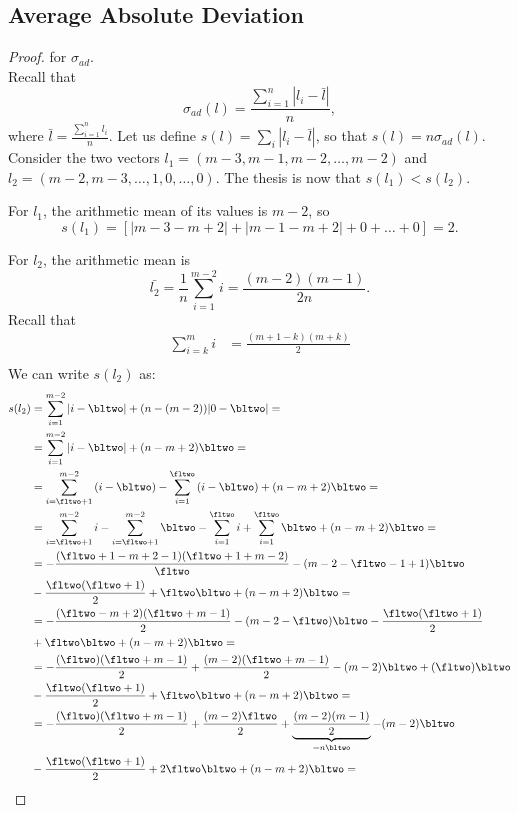 \subsection{Average Absolute Deviation}
\begin{proof} for $\sigma_{ad}$. \\
	Recall that 
	\[\sigma_{ad}(l)= \frac{\sum_{i=1}^{n}|l_i-\bar{l}|}{n},\] 
	where $\bar{l}=\frac{\sum_{i=1}^{n}l_i}{n}$.
	Let us define $s(l)= \sum_{i}|l_i-\bar{l}|$, so that $s(l) = n \sigma_{ad}(l)$.
	Consider the two vectors $l_1=(m-3, m-1, m-2, \dots, m-2)$ and $l_2=(m-2, m-3, \dots, 1, 0, \dots, 0)$. The thesis is now that $s(l_1) < s(l_2)$.
	
	For $l_1$, the arithmetic mean of its values is $m-2$, so 
	\[s(l_1)=[|m-3-m+2|+|m-1-m+2|+ 0 + \dots + 0]= 2.\]

	For $l_2$, the arithmetic mean is 
	\[\bar{l_2}=\frac{1}{n}\sum_{i=1}^{m-2}{i}= \frac{(m-2)(m-1)}{2n}.\]
	Recall that 
	\begin{align*}
		\sum_{i=k}^{m}{i} &= \frac{(m+1-k)(m+k)}{2} \\
	\end{align*}
	We can write $s(l_2)$ as:
	\begin{align*}
		s(l_2)&= \sum_{i=1}^{m-2}{|i-\bltwo|}+(n-(m-2))|0-\bltwo|=\\
		&= \sum_{i=1}^{m-2}{|i-\bltwo|}+(n-m+2)\bltwo=\\
		&=\sum_{i=\fltwo+1}^{m-2}{(i-\bltwo)}-\sum_{i=1}^{\fltwo}{(i-\bltwo)} +(n-m+2)\bltwo=\\
		&=\sum_{i=\fltwo+1}^{m-2}{i}-\sum_{i=\fltwo+1}^{m-2}{\bltwo}-\sum_{i=1}^{\fltwo}{i} +\sum_{i=1}^{\fltwo}{\bltwo}+(n-m+2)\bltwo=\\
		&= -\frac{(\fltwo+1-m+2-1)(\fltwo+1+m-2)}{\fltwo}-(m-2-\fltwo-1+1)\bltwo\\ &-\frac{\fltwo(\fltwo+1)}{2}+\fltwo \bltwo + (n-m+2)\bltwo=\\
		&=-\frac{(\fltwo-m+2)(\fltwo+m-1)}{2}-(m-2-\fltwo)\bltwo-\frac{\fltwo(\fltwo+1)}{2} \\
		&+ \fltwo \bltwo + (n-m+2)\bltwo=\\
		&=-\frac{(\fltwo)(\fltwo+m-1)}{2}+\frac{(m-2)(\fltwo+m-1)}{2} -(m-2)\bltwo+(\fltwo)\bltwo \\ &-\frac{\fltwo(\fltwo+1)}{2}+ \fltwo \bltwo + (n-m+2)\bltwo=\\
		&=-\frac{(\fltwo)(\fltwo+m-1)}{2}+\frac{(m-2)\fltwo}{2}+\underbrace{\frac{(m-2)(m-1)}{2}}_{=n \bltwo} -(m-2)\bltwo \\ &-\frac{\fltwo(\fltwo+1)}{2}+ 2\fltwo \bltwo + (n-m+2)\bltwo=\\

\end{align*}
\end{proof}
